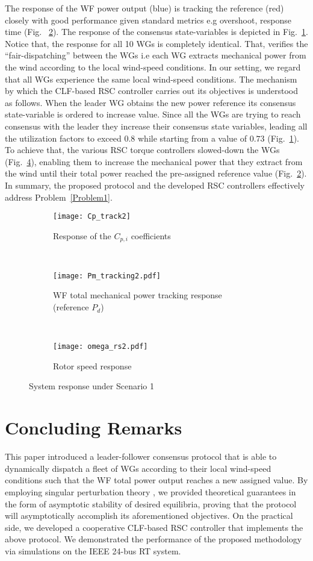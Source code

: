 \documentclass[letterpaper, 10 pt, conference]{ieeeconf}
\begin{document}
The  response of the WF power output (blue) is tracking the reference (red) closely with good performance given standard metrics e.g overshoot, response time (Fig.~ \ref{pwftrack}).  The response of the consensus state-variables is depicted in Fig.~\ref{cptrack}.  Notice that, the response for all 10 WGs is completely identical. That, verifies the ``fair-dispatching'' between the WGs i.e each WG extracts mechanical power from the wind according to the local wind-speed conditions. In our setting, we regard that all WGs experience the same local wind-speed conditions. The mechanism by which the CLF-based RSC controller carries out its objectives is understood as follows. When the leader WG obtains the new power reference its consensus state-variable is ordered to increase value. Since all the WGs are trying to reach consensus with the leader they increase their consensus state variables, leading all the utilization factors to exceed $0.8$ while starting from a value of $0.73$ (Fig.~\ref{cptrack}).  To achieve that, the various RSC torque controllers slowed-down the WGs (Fig.~\ref{rotortrack}), enabling them to increase the mechanical power that they extract from the wind until their total power reached the pre-assigned reference value (Fig.~\ref{pwftrack}).  In summary,  the proposed protocol and the developed RSC controllers effectively  address  Problem~\ref{Problem1}.
\begin{figure}
\centering
  \begin{subfigure}{0.35\textwidth}
\texttt{[image: Cp\_track2]}
\caption{Response of the $C_{p,i}$ coefficients }
\label{cptrack}
\end{subfigure}
\\
  \begin{subfigure}{0.35\textwidth}
\texttt{[image: Pm\_tracking2.pdf]}
\caption{WF total mechanical power tracking response (reference $P_d$)}
\label{pwftrack}
\end{subfigure}\\
  \begin{subfigure}{0.35\textwidth}
\texttt{[image: omega\_rs2.pdf]}
\caption{Rotor speed response}
\label{rotortrack}
\end{subfigure}
\caption{System response under Scenario 1}
\end{figure}
\section{Concluding Remarks}
This paper introduced a leader-follower consensus protocol that is able to dynamically dispatch a fleet of WGs according to their local wind-speed conditions such that the WF total power output reaches a new assigned value. By employing singular perturbation theory \cite{khalil}, we provided theoretical guarantees in the form of asymptotic stability of desired equilibria, proving that the protocol will asymptotically accomplish its aforementioned objectives.  On the practical side, we developed a cooperative CLF-based RSC controller that implements the above protocol.  We demonstrated the performance of the proposed methodology via simulations on the IEEE 24-bus RT system.
\end{document}
